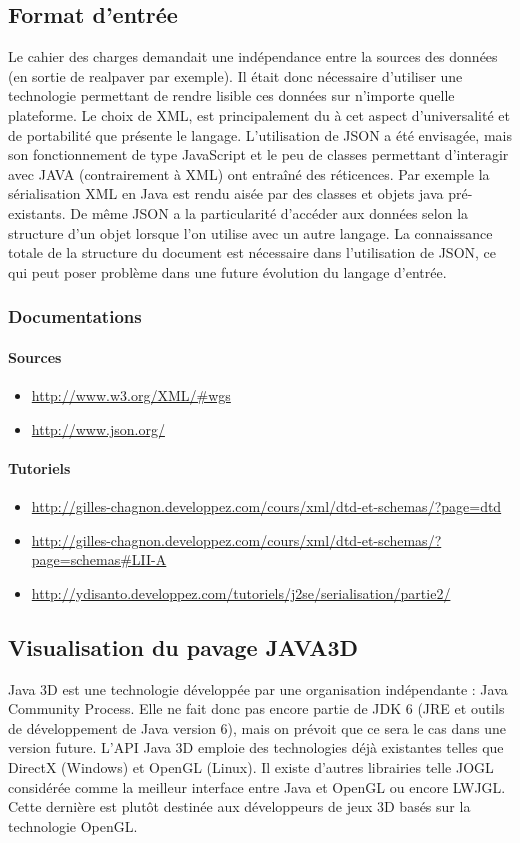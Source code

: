 \documentclass{article}
\begin{document}
\subsection{Format d'entrée}
Le cahier des charges demandait une indépendance entre la sources des données (en sortie de realpaver par exemple). 
Il était donc nécessaire d'utiliser une technologie permettant de rendre lisible ces données sur n'importe quelle plateforme.
Le choix de XML, est principalement du à cet aspect d'universalité et de portabilité que présente le langage. 
L'utilisation de JSON a été envisagée, mais son fonctionnement de type JavaScript et le peu de classes permettant d'interagir avec JAVA  (contrairement à XML) ont entraîné des réticences.
Par exemple la sérialisation XML en Java est rendu aisée par des classes et objets java pré-existants.
De même JSON a la particularité  d'accéder  aux données selon la structure d'un objet lorsque l'on utilise avec un autre langage. 
La connaissance totale de la structure du document est nécessaire dans l'utilisation de JSON, ce qui peut poser problème dans une future évolution du langage d'entrée. 

\subsubsection{Documentations}
\paragraph{Sources}
\begin{itemize}
\item 
\url{http://www.w3.org/XML/#wgs}  
\item 
\url{http://www.json.org/}                              
\end{itemize}
\paragraph{Tutoriels}
\begin{itemize}
\item 
\url{http://gilles-chagnon.developpez.com/cours/xml/dtd-et-schemas/?page=dtd}
\item
\url{http://gilles-chagnon.developpez.com/cours/xml/dtd-et-schemas/?page=schemas#LII-A}
\item
\url{http://ydisanto.developpez.com/tutoriels/j2se/serialisation/partie2/}
\end{itemize}

\subsection{Visualisation du pavage JAVA3D}
Java 3D est une technologie développée par une organisation indépendante : Java Community Process.
Elle ne fait donc pas encore partie de JDK 6 (JRE et outils de développement de Java version 6), mais on prévoit que ce sera le cas dans une version future.
L'API Java 3D emploie des technologies déjà existantes telles que DirectX (Windows) et OpenGL (Linux).
Il existe d'autres librairies telle JOGL considérée comme la meilleur interface entre Java et OpenGL ou encore LWJGL.
Cette dernière est  plutôt destinée aux développeurs de jeux 3D  basés sur la technologie OpenGL.
\end{document}
